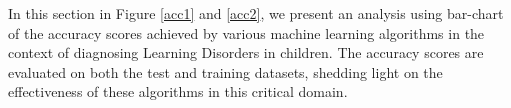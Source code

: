 \documentclass{article}
\begin{document}
\begin{multicols}{2}
\hspace*{\parindent}In this section in Figure \ref{acc1} and \ref{acc2}, we present an analysis using bar-chart of the accuracy scores achieved by various machine learning algorithms in the context of diagnosing Learning Disorders in children. The accuracy scores are evaluated on both the test and training datasets, shedding light on the effectiveness of these algorithms in this critical domain.\\


\end{multicols}
    \noindent
\end{document}
